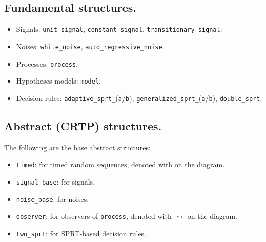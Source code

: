 \documentclass[12pt]{article}
\begin{document}
\begin{center}
\end{center}

\subsection*{Fundamental structures.}

\begin{itemize}
    \item Signals: \texttt{unit\_signal}, \texttt{constant\_signal}, \texttt{transitionary\_signal}.
    \item Noises: \texttt{white\_noise}, \texttt{auto\_regressive\_noise}.
    \item Processes: \texttt{process}.
    \item Hypotheses models: \texttt{model}.
    \item Decision rules: \texttt{adaptive\_sprt\_}(\texttt{a}/\texttt{b}), \texttt{generalized\_sprt\_}(\texttt{a}/\texttt{b}), \texttt{double\_sprt}.
\end{itemize}

\subsection*{Abstract (CRTP) structures.}

The following are the base abstract structures:
\begin{itemize}
    \item \texttt{timed}: for timed random sequences, denoted with \clock{} on the diagram.
    \item \texttt{signal\_base}: for signals.
    \item \texttt{noise\_base}: for noises.
    \item \texttt{observer}: for observers of \texttt{process}, denoted with $\rightsquigarrow $ on the diagram.
    \item \texttt{two\_sprt}: for SPRT-based decision rules.
\end{itemize}
\end{document}
